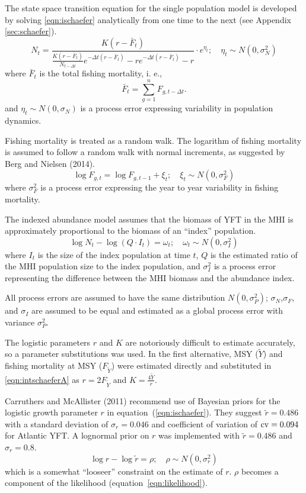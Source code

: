 \documentclass[12pt,letterpaper]{article}
\newcommand\MSY{\widetilde{Y}}
\newcommand\Fmsy{F_{\MSY}}
\begin{document}
The state space transition equation for the single population model is
developed by solving \ref{eqn:ischaefer} analytically from one time to
the next (see Appendix \ref{sec:schaefer}).
\begin{equation}
\label{eqn:intschaeferA}
N_t = \frac{K(r-\bar{F}_t)}{\frac{K(r-\bar{F}_t)}{N_{t-\Delta t}}e^{-\Delta
t(r-\bar{F}_t)}-re^{-\Delta t(r-\bar{F}_t)} -r} \cdot e^{\eta_t};
\quad \eta_t\sim N(0,\sigma^2_N)
\end{equation}
where 
$\bar{F}_t$ is the total fishing mortality, i. e.,
$$
\bar{F}_t =\sum_{g=1}^n F_{g,t-\Delta t}.
$$
and $\eta_t \sim N(0,\sigma_N)$ is a process error expressing
variability in population dynamics.

Fishing mortality is treated as a random walk.
The logarithm of fishing mortality is assumed to
follow a random walk with normal increments, as suggested by Berg and
Nielsen (2014).
\begin{equation}
\label{eqn:Fwalk}
\log F_{g,t} = \log F_{g,t-1} + \xi_t;\quad \xi_t\sim
N(0,\sigma^2_F)
\end{equation}
where  $\sigma^2_F$ is a process error expressing the year to year
variability in fishing mortality.

The indexed abundance model assumes that the biomass of YFT in the MHI
is approximately proportional to the biomass of an ``index''
population.
\begin{equation}
\log N_t - \log (Q\cdot I_t) = \omega_t;\quad \omega_t\sim N(0,\sigma^2_I)
\label{eqn:index}
\end{equation}
where
$I_t$ is the size of the index population at time $t$,
$Q$ is the estimated ratio of the MHI population size to the index
population,
and $\sigma^2_I$ is a process error representing the difference
between the MHI biomass and the abundance index. 

All process errors are assumed to have the same distribution
$N(0,\sigma^2_P)$; $\sigma_N$,$\sigma_F$, and $\sigma_I$ are assumed
to be equal and estimated as a global process error with variance
$\sigma^2_P$.

The logistic parameters $r$ and $K$ are notoriously difficult to estimate
accurately, so a parameter substitutions was used. In the first
alternative, MSY ($\MSY$) and fishing mortality at MSY ($\Fmsy$) were
estimated directly and substituted in \ref{eqn:intschaeferA} as
$r=2F_{\MSY}$ and $K=\frac{4\MSY}{r}$.

Carruthers and McAllister (2011) recommend use of Bayesian priors for the
logistic growth parameter $r$ in equation~(\ref{eqn:ischaefer}). They
suggest $\tilde{r} = 0.486$ with a standard deviation of $\sigma_r = 0.046$
and coefficient of variation of ${\rm cv}=0.094$ for Atlantic YFT.
A lognormal prior on $r$ was implemented with 
$\tilde{r} = 0.486$ and $\sigma_r = 0.8$.
\begin{equation}
\log r - \log \tilde{r} = \rho ;\quad \rho\sim N(0,\sigma^2_r)
\end{equation}
which is a somewhat ``looseer'' constraint on the estimate of $r$.
$\rho$ becomes a component of the likelihood
(equation~\ref{eqn:likelihood}).
\end{document}
